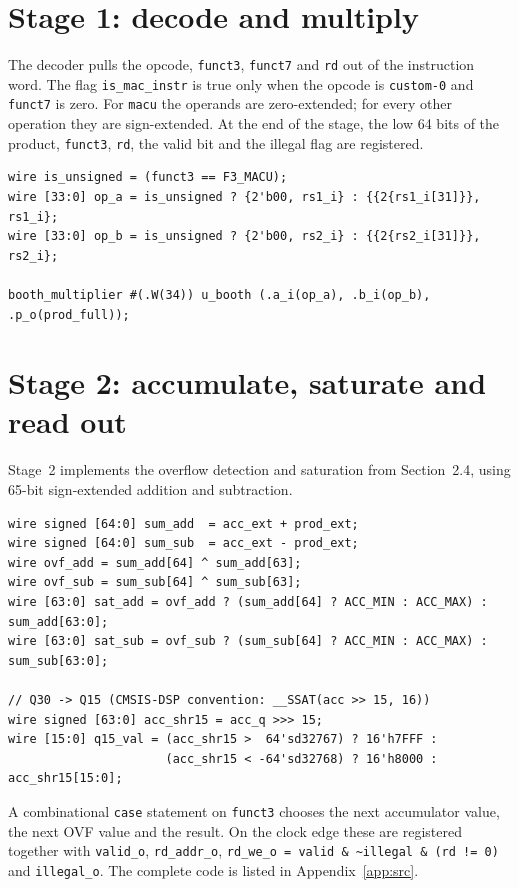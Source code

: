 \documentclass[11pt,a4paper]{report}
\newcommand{\code}[1]{\texttt{#1}}
\begin{document}
\section{Stage 1: decode and multiply}
The decoder pulls the opcode, \code{funct3}, \code{funct7} and \code{rd} out of
the instruction word. The flag \code{is\_mac\_instr} is true only when the
opcode is \code{custom-0} and \code{funct7} is zero. For \code{macu} the
operands are zero-extended; for every other operation they are sign-extended.
At the end of the stage, the low 64 bits of the product, \code{funct3},
\code{rd}, the valid bit and the illegal flag are registered.

\begin{lstlisting}[caption={Operand extension and multiplier instantiation.}]
wire is_unsigned = (funct3 == F3_MACU);
wire [33:0] op_a = is_unsigned ? {2'b00, rs1_i} : {{2{rs1_i[31]}}, rs1_i};
wire [33:0] op_b = is_unsigned ? {2'b00, rs2_i} : {{2{rs2_i[31]}}, rs2_i};

booth_multiplier #(.W(34)) u_booth (.a_i(op_a), .b_i(op_b), .p_o(prod_full));
\end{lstlisting}

\section{Stage 2: accumulate, saturate and read out}
Stage~2 implements the overflow detection and saturation from
Section~2.4, using 65-bit sign-extended addition and subtraction.

\begin{lstlisting}[caption={Saturating accumulation and Q15 conversion.}]
wire signed [64:0] sum_add  = acc_ext + prod_ext;
wire signed [64:0] sum_sub  = acc_ext - prod_ext;
wire ovf_add = sum_add[64] ^ sum_add[63];
wire ovf_sub = sum_sub[64] ^ sum_sub[63];
wire [63:0] sat_add = ovf_add ? (sum_add[64] ? ACC_MIN : ACC_MAX) : sum_add[63:0];
wire [63:0] sat_sub = ovf_sub ? (sum_sub[64] ? ACC_MIN : ACC_MAX) : sum_sub[63:0];

// Q30 -> Q15 (CMSIS-DSP convention: __SSAT(acc >> 15, 16))
wire signed [63:0] acc_shr15 = acc_q >>> 15;
wire [15:0] q15_val = (acc_shr15 >  64'sd32767) ? 16'h7FFF :
                      (acc_shr15 < -64'sd32768) ? 16'h8000 : acc_shr15[15:0];
\end{lstlisting}

A combinational \code{case} statement on \code{funct3} chooses the next
accumulator value, the next OVF value and the result. On the clock edge these
are registered together with \code{valid\_o}, \code{rd\_addr\_o},
\code{rd\_we\_o = valid \& \textasciitilde illegal \& (rd != 0)} and
\code{illegal\_o}. The complete code is listed in Appendix~\ref{app:src}.
\end{document}
